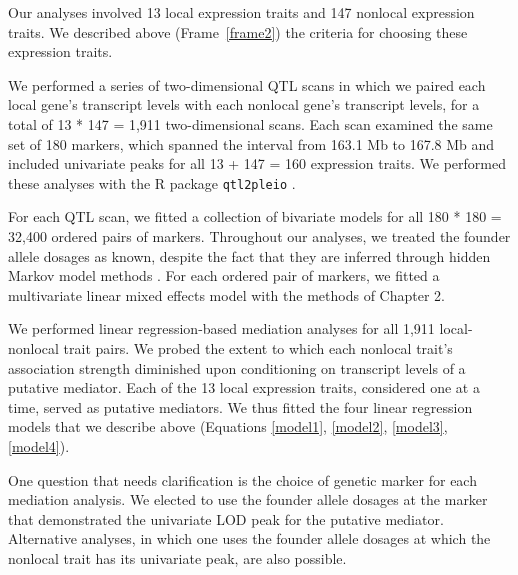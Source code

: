 \documentclass[oneside]{book}
\begin{document}

Our analyses involved 13 local expression traits and 147 nonlocal expression traits. We described above (Frame~\ref{frame2}) the criteria for choosing these expression traits.

We performed a series of two-dimensional QTL scans in which we paired each local gene's transcript levels with each nonlocal gene's transcript levels, for a total of 13 * 147 = 1,911 two-dimensional scans. Each scan examined the same set of 180 markers, which spanned the interval from 163.1 Mb to 167.8 Mb and included univariate peaks for all 13 + 147 = 160 expression traits. We performed these analyses with the R package \texttt{qtl2pleio} \citep{qtl2pleio}.

For each QTL scan, we fitted a collection of bivariate models for all 180 * 180 = 32,400 ordered pairs of markers. Throughout our analyses, we treated the founder allele dosages as known, despite the fact that they are inferred through hidden Markov model methods \citep{broman2012genotype, broman2012haplotype, broman2019rqtl2}. 
For each ordered pair of markers, we fitted a multivariate linear mixed effects model with the methods of Chapter 2.


We performed linear regression-based mediation analyses for all 1,911 local-nonlocal trait pairs. We probed the extent to which each nonlocal trait's association strength diminished upon conditioning on transcript levels of a putative mediator. Each of the 13 local expression traits, considered one at a time, served as putative mediators. We thus fitted the four linear regression models that we describe above (Equations \ref{model1}, \ref{model2}, \ref{model3}, \ref{model4}).

One question that needs clarification is the choice of genetic marker for each mediation analysis. We elected to use the founder allele dosages at the marker that demonstrated the univariate LOD peak for the putative mediator. Alternative analyses, in which one uses the founder allele dosages at which the nonlocal trait has its univariate peak, are also possible.
\end{document}
